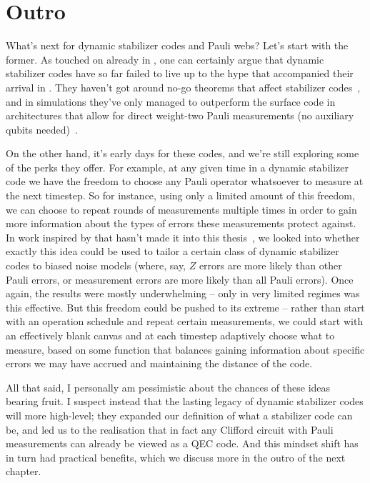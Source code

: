 \section{Outro}\label{sec:outro}

What's next for dynamic stabilizer codes and Pauli webs?
Let's start with the former.
As touched on already in , one can certainly argue that dynamic stabilizer codes have so far failed to live up to the hype that accompanied their arrival in .
They haven't got around no-go theorems that affect stabilizer codes~\cite{Fu_2025}, and in simulations they've only managed to outperform the surface code in architectures that allow for direct weight-two Pauli measurements (no auxiliary qubits needed)~\cite{dessertaine2025enhancedfaulttolerancephotonicquantum,Higgott_2024,Gidney_2021,Gidney_2022}.

On the other hand, it's early days for these codes, and we're still exploring some of the perks they offer.
For example, at any given time in a dynamic stabilizer code we have the freedom to choose any Pauli operator whatsoever to measure at the next timestep.
So for instance, using only a limited amount of this freedom, we can choose to repeat rounds of measurements multiple times in order to gain more information about the types of errors these measurements protect against.
In work inspired by  that hasn't made it into this thesis~\cite{derks2025dynamicalcodeshardwarenoisy}, we looked into whether exactly this idea could be used to tailor a certain class of dynamic stabilizer codes to biased noise models (where, say, $Z$ errors are more likely than other Pauli errors, or measurement errors are more likely than all Pauli errors).
Once again, the results were mostly underwhelming -- only in very limited regimes was this effective.
But this freedom could be pushed to its extreme -- rather than start with an operation schedule and repeat certain measurements, we could start with an effectively blank canvas and at each timestep adaptively choose what to measure, based on some function that balances gaining information about specific errors we may have accrued and maintaining the distance of the code.

All that said, I personally am pessimistic about the chances of these ideas bearing fruit.
I suspect instead that the lasting legacy of dynamic stabilizer codes will more high-level; they expanded our definition of what a stabilizer code can be, and led us to the realisation that in fact any Clifford circuit with Pauli measurements can already be viewed as a QEC code.
And this mindset shift has in turn had practical benefits, which we discuss more in the outro of the next chapter.

